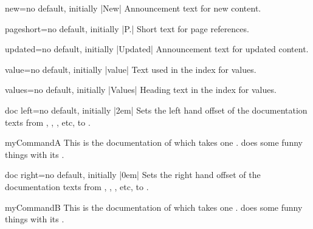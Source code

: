 \begin{langTcbKey}[][doc new={2014-09-19}]{new}{=}{no default, initially |New|}
  Announcement text for new content.
\end{langTcbKey}

\begin{langTcbKey}{pageshort}{=}{no default, initially |P.|}
  Short text for page references.
\end{langTcbKey}

\begin{langTcbKey}[][doc new={2014-09-19}]{updated}{=}{no default, initially |Updated|}
  Announcement text for updated content.
\end{langTcbKey}

\begin{langTcbKey}{value}{=}{no default, initially |value|}
  Text used in the index for values.
\end{langTcbKey}

\begin{langTcbKey}{values}{=}{no default, initially |Values|}
  Heading text in the index for values.
\end{langTcbKey}



\clearpage
\begin{docTcbKey}{doc left}{=}{no default, initially |2em|}
  Sets the left hand offset of the documentation texts from
  , , , etc, to .
\begin{dispExample}
\begin{docCommand*}[doc left=2cm,doc left indent=-2cm]{myCommandA}{}
  This is the documentation of  which takes one .
   does some funny things with its .
\end{docCommand*}
\end{dispExample}
\end{docTcbKey}

\begin{docTcbKey}{doc right}{=}{no default, initially |0em|}
  Sets the right hand offset of the documentation texts from
  , , , etc, to .
\begin{dispExample}
\begin{docCommand*}[doc right=2cm]{myCommandB}{}
  This is the documentation of  which takes one .
   does some funny things with its .
\end{docCommand*}
\end{dispExample}
\end{docTcbKey}

